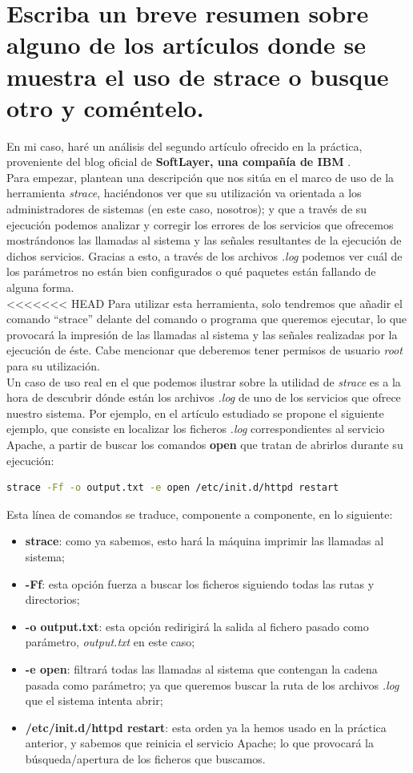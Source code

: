 \section{Escriba un breve resumen sobre alguno de los artículos donde se muestra el uso de strace o busque otro y coméntelo.}
En mi caso, haré un análisis del segundo artículo ofrecido en la práctica, proveniente del blog oficial de \textbf{SoftLayer, una compañía de IBM} \cite{softlayer-strace}. \\
Para empezar, plantean una descripción que nos sitúa en el marco de uso de la herramienta \emph{strace}, haciéndonos ver que su utilización va orientada a los administradores de sistemas (en este caso, nosotros); y que a través de su ejecución podemos analizar y corregir los errores de los servicios que ofrecemos mostrándonos las llamadas al sistema y las señales resultantes de la ejecución de dichos servicios. Gracias a esto, a través de los archivos \emph{.log} podemos ver cuál de los parámetros no están bien configurados o qué paquetes están fallando de alguna forma. \\
<<<<<<< HEAD
Para utilizar esta herramienta, solo tendremos que añadir el comando ``strace'' delante del comando o programa que queremos ejecutar, lo que provocará la impresión de las llamadas al sistema y las señales realizadas por la ejecución de éste. Cabe mencionar que deberemos tener permisos de usuario \emph{root} para su utilización. \\
Un caso de uso real en el que podemos ilustrar sobre la utilidad de \emph{strace} es a la hora de descubrir dónde están los archivos \emph{.log} de uno de los servicios que ofrece nuestro sistema. Por ejemplo, en el artículo estudiado se propone el siguiente ejemplo, que consiste en localizar los ficheros \emph{.log} correspondientes al servicio Apache, a partir de buscar los comandos \textbf{open} que tratan de abrirlos durante su ejecución:
\begin{lstlisting}[language=bash]
	strace -Ff -o output.txt -e open /etc/init.d/httpd restart
\end{lstlisting}
Esta línea de comandos se traduce, componente a componente, en lo siguiente:
\begin{itemize}
	\item \textbf{strace}: como ya sabemos, esto hará la máquina imprimir las llamadas al sistema;
	\item \textbf{-Ff}: esta opción fuerza a buscar los ficheros siguiendo todas las rutas y directorios;
	\item \textbf{-o output.txt}: esta opción redirigirá la salida al fichero pasado como parámetro, \emph{output.txt} en este caso;
	\item \textbf{-e open}: filtrará todas las llamadas al sistema que contengan la cadena pasada como parámetro; ya que queremos buscar la ruta de los archivos \emph{.log} que el sistema intenta abrir;
	\item \textbf{/etc/init.d/httpd restart}: esta orden ya la hemos usado en la práctica anterior, y sabemos que reinicia el servicio Apache; lo que provocará la búsqueda/apertura de los ficheros que buscamos.
\end{itemize}
